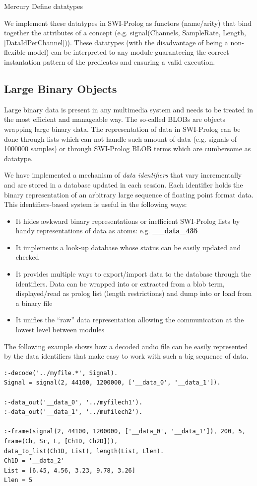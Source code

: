 \documentclass[runningheads]{llncs}
\begin{document}
\begin{itemize}
Mercury
Define datatypes
\end{itemize}

We implement these datatypes in SWI-Prolog as functors (name/arity) that bind together the attributes of a concept (e.g. signal(Channels, SampleRate, Length, [DataIdPerChannel])). These datatypes (with the disadvantage of being a non-flexible model) can be interpreted to any module guaranteeing the correct instantation pattern of the predicates and ensuring a valid execution.

\subsection{Large Binary Objects}\label{subsec:blobs}

Large binary data is present in any multimedia system and needs to be treated in the most efficient and manageable way. The so-called BLOBs are objects wrapping large binary data. The representation of data in SWI-Prolog can be done through lists which can not handle such amount of data (e.g. signals of 1000000 samples) or through SWI-Prolog BLOB terms which are cumbersome as datatype.

We have implemented a mechanism of \textit{data identifiers} that vary incrementally and are stored in a database updated in each session. Each identifier holds the binary representation of an arbitrary large sequence of floating point format data. This identifiers-based system is useful in the following ways:

\begin{itemize}
 \item It hides awkward binary representations or inefficient SWI-Prolog lists by handy representations of data as atoms: e.g. \textbf{\_\_data\_435}
 \item It implements a look-up database whose status can be easily updated and checked
 \item It provides multiple ways to export/import data to the database through the identifiers. Data can be wrapped into or extracted from a blob term, displayed/read as prolog list (length restrictions) and dump into or load from a binary file
 \item It unifies the ``raw'' data representation allowing the communication at the lowest level between modules 
\end{itemize}

The following example shows how a decoded audio file can be easily represented by the data identifiers that make easy to work with such a big sequence of data.
\begin{verbatim}
:-decode('../myfile.*', Signal).
Signal = signal(2, 44100, 1200000, ['__data_0', '__data_1']).

:-data_out('__data_0', '../myfilech1').
:-data_out('__data_1', '../mufilech2').

:-frame(signal(2, 44100, 1200000, ['__data_0', '__data_1']), 200, 5, frame(Ch, Sr, L, [Ch1D, Ch2D])),
data_to_list(Ch1D, List), length(List, Llen).
Ch1D = '__data_2'
List = [6.45, 4.56, 3.23, 9.78, 3.26]
Llen = 5
\end{verbatim}
\end{document}

